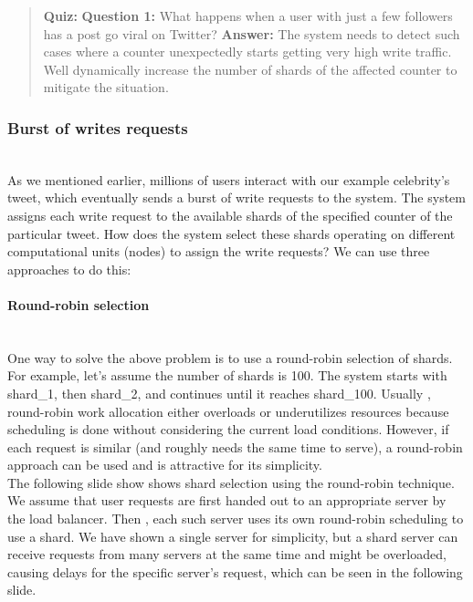 \begin{quote}
\textbf{Quiz:}
\textbf{Question 1:} What happens when a user with just a few followers has a post go viral on Twitter?
\textbf{Answer:} The system needs to detect such cases where a counter unexpectedly starts getting very high write traffic. We\textquotesingle ll dynamically increase the number of shards of the affected counter to mitigate the situation.
\end{quote}

\subsubsection{Burst of writes requests}\label{JMm48bSlEh4KpQmwG25_S}
\\
As we mentioned earlier, millions of users interact with our example celebrity's tweet, which eventually sends a burst of write requests to the system. The system assigns each write request to the available shards of the specified counter of the particular tweet. How does the system select these shards operating on different computational units (nodes) to assign the write requests? We can use three approaches to do this:
\\
\paragraph{Round-robin selection}\label{Bvy9fUPOUD3T3_GO0O48a}
\\
One way to solve the above problem is to use a round-robin selection of shards. For example, let's assume the number of shards is 100. The system starts with shard\_1, then shard\_2, and continues until it reaches shard\_100. Usually , round-robin work allocation either overloads or underutilizes resources because scheduling is done without considering the current load conditions. However, if each request is similar (and roughly needs the same time to serve), a round-robin approach can be used and is attractive for its simplicity.
\\
The following slide show shows shard selection using the round-robin technique. We assume that user requests are first handed out to an appropriate server by the load balancer. Then , each such server uses its own round-robin scheduling to use a shard. We have shown a single server for simplicity, but a shard server can receive requests from many servers at the same time and might be overloaded, causing delays for the specific server's request, which can be seen in the following slide.

